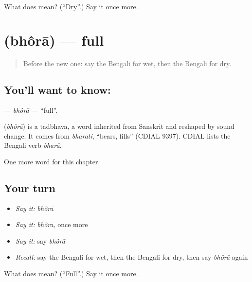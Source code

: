 \begin{tcolorbox}[breakable,colback=teal!4,colframe=teal!35!black,title={Before you move on}]
What does  mean? (\textquotedblleft{}Dry\textquotedblright{}.) Say it once more.
\end{tcolorbox}
\section[\texorpdfstring{\bn{ভরা} (bhôrā)}{ভরা (bhôrā)}]{ (bhôrā) — full}

\label{lesson:BN-C135-bhora}



\begin{quote}
Before the new one: say the Bengali for wet, then the Bengali for dry.
\end{quote}

\subsection*{You'll want to know: }
\textbf{} — \emph{bhôrā} — \textquotedblleft{}full\textquotedblright{}.

\begin{cousinweb}
\textbf{} (\emph{bhôrā}) is a tadbhava, a word inherited from Sanskrit and reshaped by sound change. It comes from \emph{bharati}, \textquotedblleft{}bears, fills\textquotedblright{} (CDIAL 9397). CDIAL lists the Bengali verb \emph{bharā}.
\end{cousinweb}

\begin{grammarlens}[title={What you've built}]
One more word for this chapter.
\end{grammarlens}

\subsection*{Your turn}
\begin{itemize}
\raggedright
  \item \emph{Say it:} \emph{bhôrā}
  \item \emph{Say it:} \emph{bhôrā}, once more
  \item \emph{Say it:} say \emph{bhôrā}
  \item \emph{Recall:} say the Bengali for wet, then the Bengali for dry, then say \emph{bhôrā} again
\end{itemize}

\begin{tcolorbox}[breakable,colback=teal!4,colframe=teal!35!black,title={Before you move on}]
What does  mean? (\textquotedblleft{}Full\textquotedblright{}.) Say it once more.
\end{tcolorbox}
